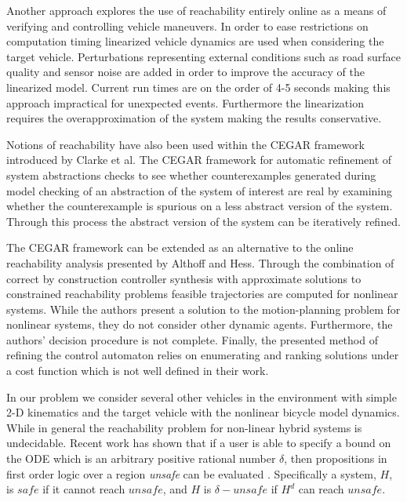 Another approach explores the use of reachability entirely online as a means of verifying and controlling vehicle maneuvers. In order to ease restrictions on computation timing linearized vehicle dynamics are used when considering the target vehicle. Perturbations representing external conditions such as road surface quality and sensor noise are added in order to improve the accuracy of the linearized model. Current run times are on the order of 4-5 seconds making this approach impractical for unexpected events. Furthermore the linearization requires the overapproximation of the system making the results conservative.\cite{Althoff2014b}

Notions of reachability have also been used within the CEGAR framework introduced by Clarke et al. The CEGAR framework for automatic refinement of system abstractions checks to see whether counterexamples generated during model checking of an abstraction of the system of interest are real by examining  whether the counterexample is spurious on a less abstract version of the system. Through this process the abstract version of the system can be iteratively refined.\cite{Clarke2003}

The CEGAR framework can be extended as an alternative to the online reachability analysis presented by Althoff and Hess. Through the combination of correct by construction controller synthesis with approximate solutions to constrained reachability problems feasible trajectories are computed for nonlinear systems. While the authors present a solution to the motion-planning problem for nonlinear systems, they do not consider other dynamic agents. Furthermore, the authors' decision procedure is not complete. Finally, the presented method of refining the control automaton relies on enumerating and ranking solutions under a cost function which is not well defined in their work.\cite{Wolff2013}

In our problem we consider several other vehicles in the environment with simple 2-D kinematics and the target vehicle with the nonlinear bicycle model dynamics. While in general the reachability problem for non-linear hybrid systems is undecidable. Recent work has shown that if a user is able to specify a bound on the ODE which is an arbitrary positive rational number \(\delta\), then propositions in first order logic over a region \textit{unsafe} can be evaluated \cite{gao2014delta}. Specifically a system, \(H\), is \(safe\) if it cannot reach \(unsafe\), and \(H\) is \(\delta-unsafe\) if \(H^d\) can reach \(unsafe\). 

